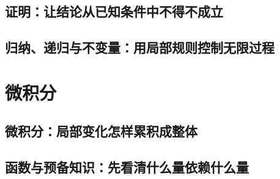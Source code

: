 \documentclass[UTF8,openany]{ctexbook}
\theoremstyle{definition}
\theoremstyle{plain}
\begin{document}
\chapter*{证明：让结论从已知条件中不得不成立}
\label{ch:006}





\clearpage
\chapter*{归纳、递归与不变量：用局部规则控制无限过程}
\label{ch:007}





\clearpage
\part{微积分}
\chapter*{微积分：局部变化怎样累积成整体}
\label{ch:008}

\clearpage
\chapter*{函数与预备知识：先看清什么量依赖什么量}
\label{ch:009}






\clearpage
\end{document}
